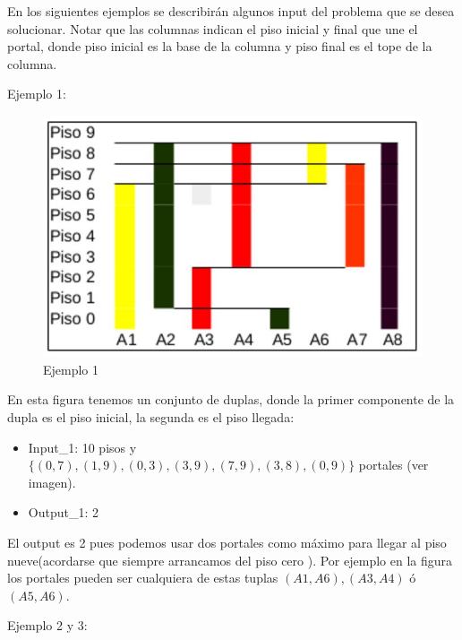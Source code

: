 En los siguientes ejemplos se describirán algunos input del problema que se desea solucionar.
Notar que las columnas indican el piso inicial y final que une el portal, donde piso inicial es la base de la columna y piso final es el tope de la columna. \newline
 
 Ejemplo 1: \newline
 
\begin{figure}[htb]
  \centering
   \includegraphics[scale=0.25]{imagenes/problema1Imagen1.jpg}
  \caption{Ejemplo 1}
\end{figure} 



En esta figura tenemos un conjunto de duplas, donde la primer componente de la dupla es el piso inicial, la segunda es el piso llegada: \newline

\begin{itemize}
    \item Input_1: 10 pisos y $\{(0,7),(1,9),(0,3),(3,9),(7,9),(3,8),(0,9)\} $ portales (ver imagen).
    \item Output_1: 2 
\end{itemize}
El output es 2 pues podemos usar dos portales como máximo para llegar al piso nueve(acordarse que siempre arrancamos del piso cero ). Por ejemplo en la figura los portales pueden ser cualquiera de estas tuplas $(A1,A6),(A3,A4)$ ó $(A5,A6)$.
\newline


Ejemplo 2 y 3:


